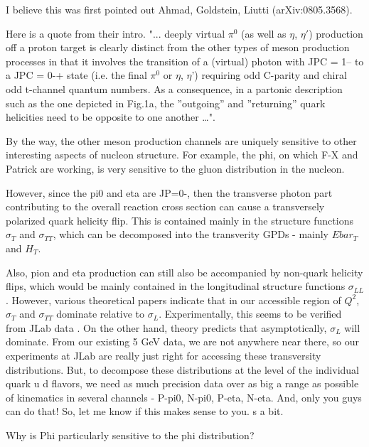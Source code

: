             I believe this was first  pointed out  Ahmad, Goldstein, Liutti (arXiv:0805.3568). 
            
            Here is a quote from their intro.
            "... deeply virtual $\pi^0$ (as well as $\eta$, $\eta'$) production off a proton target is clearly distinct from the other types of meson production processes in that it involves the transition of a (virtual) photon with JPC = 1-- to a JPC = 0-+ state (i.e. the final $\pi^0$ or $\eta$, $\eta$') requiring odd C-parity and chiral odd t-channel quantum numbers. As a consequence, in a partonic description such as the one depicted in Fig.1a, the ”outgoing” and ”returning” quark helicities need to be opposite to one another …". 

        
            
            By the way, the other meson production channels  are uniquely sensitive to other  interesting aspects of nucleon structure. For example, the phi, on which F-X and Patrick are working, is very sensitive to the gluon distribution in the nucleon.


        	However,  since the pi0 and eta are JP=0-, then the transverse photon part contributing to the overall reaction cross section can cause a transversely polarized  quark helicity flip. This is contained mainly  in the structure functions $\sigma_T$ and $\sigma_{TT}$, which can be decomposed into the transverity GPDs - mainly $Ebar_T$ and $H_T$. 
        	
        	Also, pion and eta production can still also be accompanied by non-quark helicity flips, which would be mainly contained in the longitudinal structure functions $\sigma_{LL}$. However, various theoretical papers indicate that in our accessible region of $Q^2$, $\sigma_T$ and $\sigma_{TT}$ dominate relative to $\sigma_L$. Experimentally, this seems to be verified from JLab data .
        	On the other hand, theory predicts that asymptotically, $\sigma_L$ will dominate. From our existing 5 GeV  data, we are not anywhere near there, so our experiments at JLab are really just right for accessing these transversity distributions.  But, to decompose these distributions  at the level of the individual quark u d flavors, we need as much precision data over as big a range as possible of kinematics in several channels - P-pi0, N-pi0, P-eta, N-eta. And, only you guys can do that!
        	So, let me know if this makes sense to you. s a bit. 
        	
            Why is Phi particularly sensitive to the phi distribution?
    
